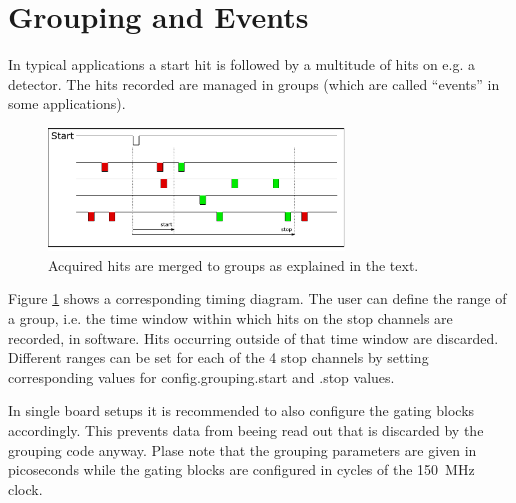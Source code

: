 \section{Grouping and Events}
\label{grouping}

In typical applications a start hit is followed by a multitude of hits on e.g. a detector. 
The hits recorded are managed in groups (which are called ``events'' in some applications). 
%
\begin{figure}[ht]
    \begin{center}
        \includegraphics[width=0.7\textwidth]{figures/grouping.pdf}
        \caption{Acquired hits are merged to groups as explained in the text.\label{fig:grouping}}
    \end{center}
\end{figure}
%

Figure \ref{fig:grouping} shows a corresponding timing diagram. The user can define the range of a group, i.e. the time window within which hits 
on the stop channels are recorded, in software. Hits occurring outside of that time window are discarded. 
 Different ranges can be set for each of the 4 stop channels by setting corresponding values for \textsf{config.grouping.start} and \textsf{.stop} values.


 In single board setups it is recommended to also configure the gating blocks accordingly. 
 This prevents data from beeing read out that is discarded by the grouping code anyway. 
 Plase note that the grouping parameters are given in picoseconds while the gating blocks are configured in cycles of the 150~MHz clock.

